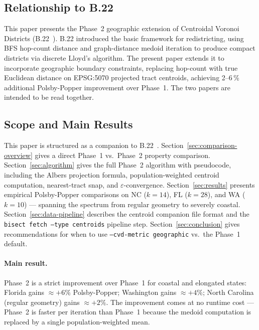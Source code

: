 \subsection{Relationship to B.22}
\label{sec:relationship-b22}

This paper presents the Phase~2 geographic extension of Centroidal Voronoi
Districts (B.22~\cite{dellaLibera2026cvd}).
B.22 introduced the basic \cvd{} framework for redistricting, using BFS
hop-count distance and graph-distance medoid iteration to produce compact
districts via discrete Lloyd's algorithm.
The present paper extends it to incorporate geographic boundary constraints,
replacing hop-count with true Euclidean distance on EPSG:5070 projected
tract centroids, achieving 2--6\,\% additional Polsby-Popper improvement
over Phase~1.
The two papers are intended to be read together.

\subsection{Scope and Main Results}

This paper is structured as a companion to B.22~\citep{dellaLibera2026cvd}.
Section~\ref{sec:comparison-overview} gives a direct Phase~1 vs.\ Phase~2
property comparison.
Section~\ref{sec:algorithm} gives the full Phase~2 algorithm with pseudocode,
including the Albers projection formula, population-weighted centroid computation,
nearest-tract snap, and $\varepsilon$-convergence.
Section~\ref{sec:results} presents empirical Polsby-Popper comparisons on
NC ($k=14$), FL ($k=28$), and WA ($k=10$) --- spanning the spectrum from
regular geometry to severely coastal.
Section~\ref{sec:data-pipeline} describes the centroid companion file format
and the \texttt{bisect fetch --type centroids} pipeline step.
Section~\ref{sec:conclusion} gives recommendations for when to use
\texttt{--cvd-metric geographic} vs.\ the Phase~1 default.

\paragraph{Main result.}
Phase~2 \cvdgeo{} is a strict improvement over Phase~1 \cvd{} for coastal and
elongated states: Florida gains $\approx +6\%$ Polsby-Popper; Washington gains
$\approx +4\%$; North Carolina (regular geometry) gains $\approx +2\%$.
The improvement comes at no runtime cost --- Phase~2 is faster per iteration
than Phase~1 because the medoid computation is replaced by a single
population-weighted mean.

